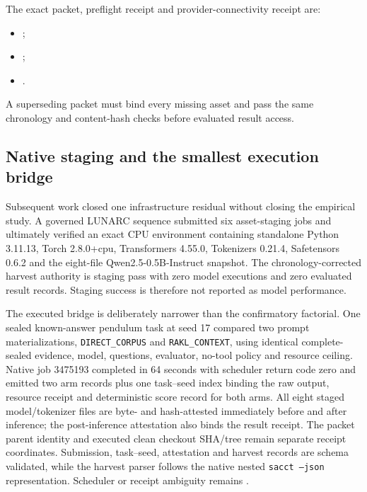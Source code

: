 The exact packet, preflight receipt and provider-connectivity receipt are:
\begin{itemize}[leftmargin=2em]
\item {};

\item {};

\item {}.
\end{itemize}
A superseding packet must bind every missing asset and pass the same chronology and content-hash checks before evaluated result access.

\subsection{Native staging and the smallest execution bridge}

Subsequent work closed one infrastructure residual without closing the empirical
study.  A governed LUNARC sequence submitted six asset-staging jobs and ultimately
verified an exact CPU environment containing standalone Python 3.11.13, Torch
2.8.0+cpu, Transformers 4.55.0, Tokenizers 0.21.4, Safetensors 0.6.2 and the
eight-file Qwen2.5-0.5B-Instruct snapshot.  The chronology-corrected harvest
authority is staging pass with zero model executions and zero evaluated result
records.  Staging success is therefore not reported as model performance.

The executed bridge is deliberately narrower than the confirmatory factorial.
One sealed known-answer pendulum task at seed 17 compared two
prompt materializations, \texttt{DIRECT\_CORPUS} and
\texttt{RAKL\_CONTEXT}, using identical complete-sealed evidence, model,
questions, evaluator, no-tool policy and resource ceiling.  Native job 3475193
completed in 64 seconds with scheduler return code zero and emitted two arm
records plus one task--seed index binding the raw output,
resource receipt and deterministic score record for both arms.  All eight staged
model/tokenizer files are byte- and hash-attested immediately before and after
inference; the post-inference attestation also binds the result receipt.  The
packet parent identity and executed clean checkout SHA/tree remain separate
receipt coordinates.  Submission, task--seed, attestation and harvest records
are schema validated, while the harvest parser follows the native nested
\texttt{sacct --json} representation.  Scheduler or receipt ambiguity remains
\CannotCheck{}.

